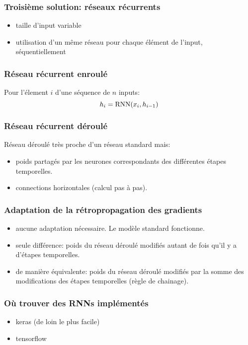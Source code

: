 \documentclass{formation}
\begin{document}
\begin{frame}
  \frametitle{Troisième solution: réseaux récurrents}
  \begin{itemize}
  \item taille d'input variable
  \item utilisation d'un même réseau pour chaque élément de l'input,
    séquentiellement
  \end{itemize}
\end{frame}

\begin{frame}
  \frametitle{Réseau récurrent enroulé}
  Pour l'élement $i$ d'une séquence de $n$ inputs:
  \[
    h_i = \RNN(x_i, h_{i-1})
  \]
\end{frame}

\begin{frame}
  \frametitle{Réseau récurrent déroulé}
  Réseau déroulé très proche d'un réseau standard mais:
  \begin{itemize}
  \item poids partagés par les neurones correspondants des différentes
    étapes temporelles.
  \item connections horizontales (calcul pas à pas).
  \end{itemize}
  
\end{frame}

\begin{frame}
  \frametitle{Adaptation de la rétropropagation des gradients}

  \begin{itemize}
  \item aucune adaptation nécessaire. Le modèle standard fonctionne.
  \item seule différence: poids du réseau déroulé modifiés autant de
    fois qu'il y a d'étapes temporelles.
  \item de manière équivalente: poids du réseau déroulé modifiés par
    la somme des modifications des étapes temporelles (règle de
    chainage).
  \end{itemize}

\end{frame}

\begin{frame}
  \frametitle{Où trouver des RNNs implémentés}

  \begin{itemize}
  \item keras (de loin le plus facile)
  \item tensorflow
  \end{itemize}
\end{frame}
\end{document}
